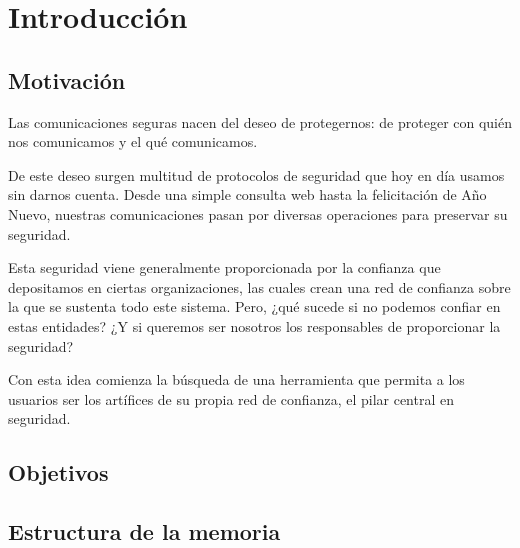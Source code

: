 
\chapter{Introducción} %

\label{Chapter1} %


\section{Motivación}
Las comunicaciones seguras nacen del deseo de protegernos: de proteger con quién nos comunicamos y el qué comunicamos.

De este deseo surgen multitud de protocolos de seguridad que hoy en día usamos sin darnos cuenta. Desde una simple consulta web hasta la felicitación de Año Nuevo, nuestras comunicaciones pasan por diversas operaciones para preservar su seguridad.

Esta seguridad viene generalmente proporcionada por la confianza que depositamos en ciertas organizaciones, las cuales crean una red de confianza sobre la que se sustenta todo este sistema. Pero, ¿qué sucede si no podemos confiar en estas entidades? ¿Y si queremos ser nosotros los responsables de proporcionar la seguridad?

Con esta idea comienza la búsqueda de una herramienta que permita a los usuarios ser los artífices de su propia red de confianza, el pilar central en seguridad.


\section{Objetivos}


\section{Estructura de la memoria}

